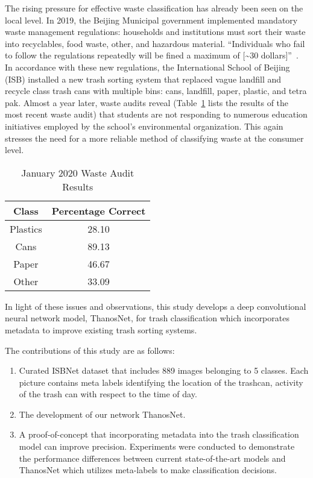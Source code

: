 \documentclass[conference]{ieeeconf}
\begin{document}
The rising pressure for effective waste classification has already been seen on the local level. In 2019, the Beijing Municipal government implemented mandatory waste management regulations: households and institutions must sort their waste into recyclables, food waste, other, and hazardous material. “Individuals who fail to follow the regulations repeatedly will be fined a maximum of [\textasciitilde30 dollars]”~\cite{BeijingWaste}. In accordance with these new regulations, the International School of Beijing (ISB) installed a new trash sorting system that replaced vague landfill and recycle class trash cans with multiple bins: cans, landfill, paper, plastic, and tetra pak. Almost a year later, waste audits reveal (Table~\ref{table:wasteAudit} lists the results of the most recent waste audit) that students are not responding to numerous education initiatives employed by the school’s environmental organization. This again stresses the need for a more reliable method of classifying waste at the consumer level. 

\begin{table}[H]
\centering
    \begin{tabular}{|c|c|}
    \hline
    Class & Percentage Correct \\ \hline
    Plastics & 28.10 \\ \hline
    Cans & 89.13 \\ \hline
    Paper & 46.67 \\ \hline
    Other & 33.09 \\ \hline
    \end{tabular}
\caption{January 2020 Waste Audit Results}
\label{table:wasteAudit}
\vspace{-0.25 in}
\end{table}

In light of these issues and observations, this study develops a deep convolutional neural network model, ThanosNet, for trash classification which incorporates metadata to improve existing trash sorting systems.

The contributions of this study are as follows:
\begin{enumerate}
    \item Curated ISBNet dataset that includes 889 images belonging to 5 classes. Each picture contains meta labels identifying the location of the trashcan, activity of the trash can with respect to the time of day.
    \item The development of our network ThanosNet. 
    \item A proof-of-concept that incorporating metadata into the trash classification model can improve precision. Experiments were conducted to demonstrate the performance differences between current state-of-the-art models and ThanosNet which utilizes meta-labels to make classification decisions. 
\end{enumerate}
\end{document}
